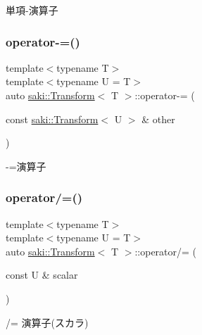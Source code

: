 単項-\/演算子 

\mbox{\label{classsaki_1_1_transform_adb08907303d87e63755a01410ea6787e}} 
\subsubsection{\texorpdfstring{operator-\/=()}{operator-=()}}
{\footnotesize\ttfamily template$<$typename T$>$ \\
template$<$typename U  = T$>$ \\
auto \mbox{\hyperlink{classsaki_1_1_transform}{saki\+::\+Transform}}$<$ T $>$\+::operator-\/= (\begin{DoxyParamCaption}\item[{const \mbox{\hyperlink{classsaki_1_1_transform}{saki\+::\+Transform}}$<$ U $>$ \&}]{other }\end{DoxyParamCaption})\hspace{0.3cm}{\ttfamily [inline]}}



-\/=演算子 

\mbox{\label{classsaki_1_1_transform_a9a5559fdf626c8ecec063db74c6f4f8e}} 
\subsubsection{\texorpdfstring{operator/=()}{operator/=()}}
{\footnotesize\ttfamily template$<$typename T$>$ \\
template$<$typename U  = T$>$ \\
auto \mbox{\hyperlink{classsaki_1_1_transform}{saki\+::\+Transform}}$<$ T $>$\+::operator/= (\begin{DoxyParamCaption}\item[{const U \&}]{scalar }\end{DoxyParamCaption})\hspace{0.3cm}{\ttfamily [inline]}}



/= 演算子(スカラ) 

\mbox{\label{classsaki_1_1_transform_acfdf423e01196edf631f272400645cfa}} 
